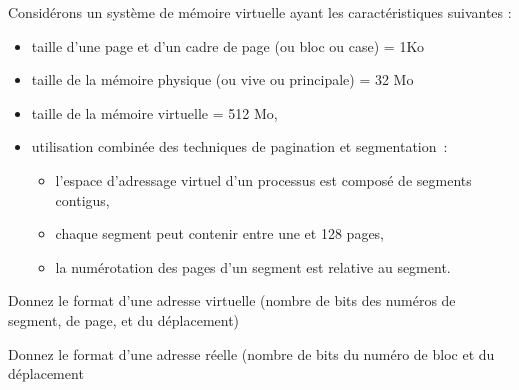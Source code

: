 \documentclass[11pt]{article}
\newcounter{cq}
\begin{document}
Considérons un système de mémoire virtuelle ayant les caractéristiques 
suivantes :
\begin{itemize}
\item taille d'une page et d'un cadre de page (ou bloc ou case) = 1Ko
\item taille de la mémoire physique (ou vive ou principale) = 32 Mo
\item taille de la mémoire virtuelle = 512 Mo,
\item utilisation combinée des techniques de pagination et segmentation~: 
\begin{itemize}
\item l'espace d'adressage virtuel d'un processus est composé de segments contigus,
\item chaque segment peut contenir entre une et 128 pages,
\item la numérotation des pages d'un segment est relative au segment.\\
\end{itemize}
\end{itemize}

Donnez le format d'une adresse virtuelle (nombre de bits des numéros
de segment, de page, et du déplacement)

Donnez le format d'une adresse réelle (nombre de bits du numéro de bloc et du déplacement
\end{document}
